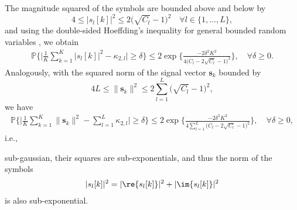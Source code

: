 The magnitude squared of the symbols are bounded above and below by
\begin{equation}
4\leq|s_{l}[k]|^2\leq 2\big(\sqrt{C_l}-1\big)^2\quad\forall l\in\{1,\ldots,L\},
\end{equation}
and using the double-sided Hoeffding’s inequality for general bounded random variables \cite{Vershynin2018hdprobability}, we obtain 
\begin{align}
\mathbb{P}\Bigg\{\Bigg|\frac{1}{K}\sum_{k=1}^K|s_l[k]|^2-\kappa_{2,l}\Bigg|\geq \delta\Bigg\} \leq 2\exp\Bigg\{\frac{-2\delta^2K^2}{4\big(C_l-2\sqrt{C_l}-1\big)^2}\Bigg\},\quad\forall \delta\geq 0.
\end{align}
Analogously, with the squared norm of the signal vector $\bm{s}_k$ bounded by
\begin{equation}
4L\leq\|\bm{s}_k\|^2\leq 2\sum_{l=1}^L\big(\sqrt{C_l}-1\big)^2,
\end{equation}
we have
\begin{align}
\mathbb{P}\Bigg\{\Bigg|\frac{1}{K}\sum_{k=1}^K\|\bm{s}_k\|^2-\sum_{l=1}^L\kappa_{2,l}\Bigg|\geq \delta\Bigg\} \leq 2\exp\Bigg\{\frac{-2\delta^2K^2}{4\sum_{l=1}^L\big(C_l-2\sqrt{C_l}-1\big)^2}\Bigg\},\quad\forall \delta\geq 0,
\end{align}
i.e., 





%
%


 sub-gaussian, their squares are sub-exponentials, and thus the norm of the symbols
\begin{align}
|s_l[k]|^2 = |\re\{s_l[k]\}|^2+|\im\{s_l[k]\}|^2
\end{align}
is also sub-exponential. 


